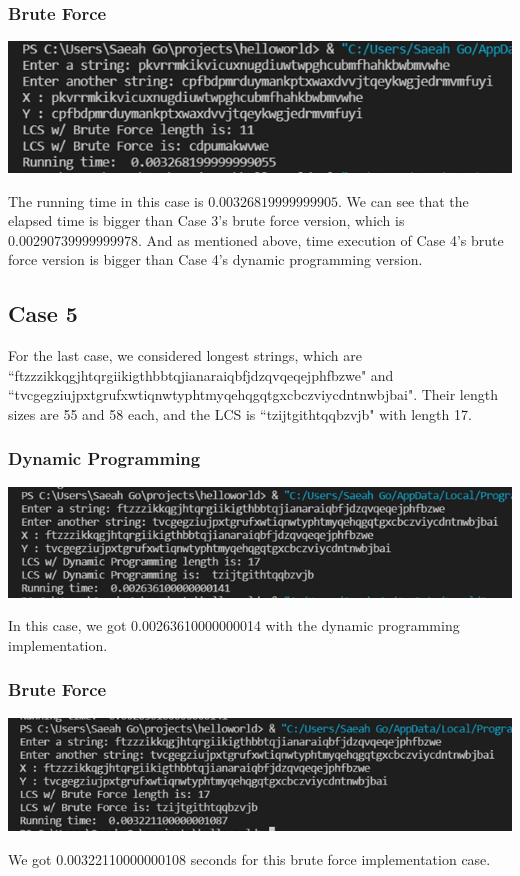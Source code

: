 \documentclass{article}
\begin{document}
\subsubsection{Brute Force}
\begin{center}
\includegraphics[scale = 0.7]{case4 BF.png} \\
\end{center}
The running time in this case is $0.00326819999999905$. We can see that the elapsed time is bigger than Case 3's brute force version, which is  $0.00290739999999978$. And as mentioned above, time execution of Case 4's brute force version is bigger than Case 4's dynamic programming version.


\subsection{\textbf{Case 5}} 
For the last case, we considered longest strings, which are ``ftzzzikkqgjhtqrgiikigthbbtqjianaraiqbfjdzqvqeqejphfbzwe" and 
``tvcgegziujpxtgrufxwtiqnwtyphtmyqehqgqtgxcbczviycdntnwbjbai". Their length sizes are 55 and 58 each, and the LCS is ``tzijtgithtqqbzvjb" with length 17.
\subsubsection{Dynamic Programming}
\begin{center}
\includegraphics[scale = 0.7]{case5 DP.png} \\
\end{center}
In this case, we got 0.00263610000000014 with the dynamic programming implementation.
\subsubsection{Brute Force}
\begin{center}
\includegraphics[scale = 0.7]{case5 BF.png} \\
\end{center}
We got 0.00322110000000108 seconds for this brute force implementation case.
\end{document}
